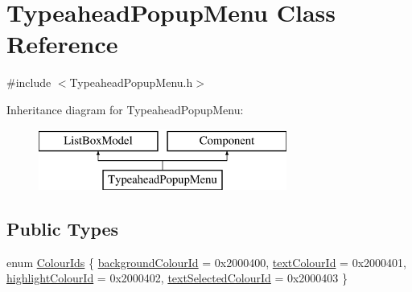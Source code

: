 \hypertarget{class_typeahead_popup_menu}{}\section{Typeahead\+Popup\+Menu Class Reference}
\label{class_typeahead_popup_menu}


{\ttfamily \#include $<$Typeahead\+Popup\+Menu.\+h$>$}

Inheritance diagram for Typeahead\+Popup\+Menu\+:\begin{figure}[H]
\begin{center}
\leavevmode
\includegraphics[height=2.000000cm]{class_typeahead_popup_menu}
\end{center}
\end{figure}
\subsection*{Public Types}
\begin{DoxyCompactItemize}
\item 
enum \hyperlink{class_typeahead_popup_menu_ab0938f3a6c7b9349f698cd65a97cdbf9}{Colour\+Ids} \{ \hyperlink{class_typeahead_popup_menu_ab0938f3a6c7b9349f698cd65a97cdbf9a8dd4222711cd9b6ec71091e3ec3dee06}{background\+Colour\+Id} = 0x2000400, 
\hyperlink{class_typeahead_popup_menu_ab0938f3a6c7b9349f698cd65a97cdbf9a2472a86e906ec8973a442008c15cac9d}{text\+Colour\+Id} = 0x2000401, 
\hyperlink{class_typeahead_popup_menu_ab0938f3a6c7b9349f698cd65a97cdbf9ad97aea57b8ccf23a19774c3f64216688}{highlight\+Colour\+Id} = 0x2000402, 
\hyperlink{class_typeahead_popup_menu_ab0938f3a6c7b9349f698cd65a97cdbf9ab02a4a7379c248f384d849cb327d01ae}{text\+Selected\+Colour\+Id} = 0x2000403
 \}
\end{DoxyCompactItemize}
